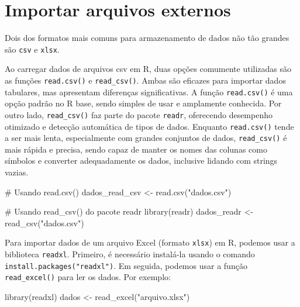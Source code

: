 \documentclass[
  portuguese,
  letterpaper,
  DIV=11,
  numbers=noendperiod]{scrreprt}
\newenvironment{Shaded}{\begin{snugshade}}{\end{snugshade}}
\newcommand{\CommentTok}[1]{\textcolor[rgb]{0.37,0.37,0.37}{#1}}
\newcommand{\FunctionTok}[1]{\textcolor[rgb]{0.28,0.35,0.67}{#1}}
\newcommand{\NormalTok}[1]{\textcolor[rgb]{0.00,0.23,0.31}{#1}}
\newcommand{\OtherTok}[1]{\textcolor[rgb]{0.00,0.23,0.31}{#1}}
\newcommand{\StringTok}[1]{\textcolor[rgb]{0.13,0.47,0.30}{#1}}
\theoremstyle{definition}
\theoremstyle{remark}
\begin{document}
\section{Importar arquivos externos}\label{importar-arquivos-externos}

Dois dos formatos mais comuns para armazenamento de dados não tão
grandes são \texttt{csv} e \texttt{xlsx}.

Ao carregar dados de arquivos csv em R, duas opções comumente utilizadas
são as funções \texttt{read.csv()} e \texttt{read\_csv()}. Ambas são
eficazes para importar dados tabulares, mas apresentam diferenças
significativas. A função \texttt{read.csv()} é uma opção padrão no R
base, sendo simples de usar e amplamente conhecida. Por outro lado,
\texttt{read\_csv()} faz parte do pacote \texttt{readr}, oferecendo
desempenho otimizado e detecção automática de tipos de dados. Enquanto
\texttt{read.csv()} tende a ser mais lenta, especialmente com grandes
conjuntos de dados, \texttt{read\_csv()} é mais rápida e precisa, sendo
capaz de manter os nomes das colunas como símbolos e converter
adequadamente os dados, inclusive lidando com strings vazias.

\begin{Shaded}
\begin{Highlighting}[]
\CommentTok{\# Usando read.csv()}
\NormalTok{dados\_read\_csv }\OtherTok{\textless{}{-}} \FunctionTok{read.csv}\NormalTok{(}\StringTok{"dados.csv"}\NormalTok{)}

\CommentTok{\# Usando read\_csv() do pacote readr}
\FunctionTok{library}\NormalTok{(readr)}
\NormalTok{dados\_readr }\OtherTok{\textless{}{-}} \FunctionTok{read\_csv}\NormalTok{(}\StringTok{"dados.csv"}\NormalTok{)}
\end{Highlighting}
\end{Shaded}

Para importar dados de um arquivo Excel (formato \texttt{xlsx}) em R,
podemos usar a biblioteca \texttt{readxl}. Primeiro, é necessário
instalá-la usando o comando \texttt{install.packages("readxl")}. Em
seguida, podemos usar a função \texttt{read\_excel()} para ler os dados.
Por exemplo:

\begin{Shaded}
\begin{Highlighting}[]
\FunctionTok{library}\NormalTok{(readxl)}
\NormalTok{dados }\OtherTok{\textless{}{-}} \FunctionTok{read\_excel}\NormalTok{(}\StringTok{"arquivo.xlsx"}\NormalTok{)}
\end{Highlighting}
\end{Shaded}
\end{document}
